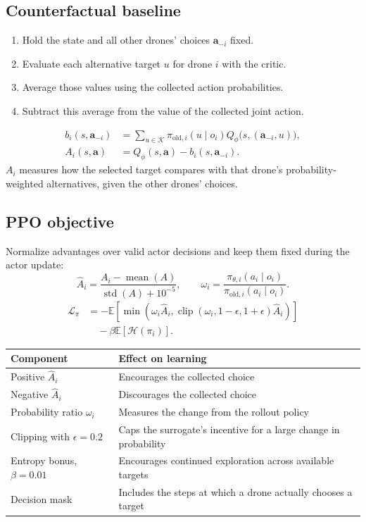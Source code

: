 \documentclass[11pt,a4paper]{article}
\newcommand{\E}{\mathbb E}
\begin{document}
\subsection{Counterfactual baseline}
\begin{enumerate}
\item Hold the state and all other drones' choices $\boldsymbol a_{-i}$ fixed.
\item Evaluate each alternative target $u$ for drone $i$ with the critic.
\item Average those values using the collected action probabilities.
\item Subtract this average from the value of the collected joint action.
\end{enumerate}
\begin{align*}
b_i(s,\boldsymbol a_{-i})
&=\sum_{u\in\mathcal K}\pi_{\mathrm{old},i}(u\mid o_i)
Q_\phi\bigl(s,(\boldsymbol a_{-i},u)\bigr),\\
A_i(s,\boldsymbol a)&=Q_\phi(s,\boldsymbol a)-b_i(s,\boldsymbol a_{-i}).
\end{align*}
$A_i$ measures how the selected target compares with
that drone's probability-weighted alternatives, given the other drones' choices.

\newpage
\subsection{PPO objective}
Normalize advantages over valid actor decisions and keep them fixed during the actor update:
\[
\widehat A_i=\frac{A_i-\operatorname{mean}(A)}{\operatorname{std}(A)+10^{-5}},
\qquad
\omega_i=\frac{\pi_{\theta,i}(a_i\mid o_i)}{\pi_{\mathrm{old},i}(a_i\mid o_i)}.
\]
\begin{align*}
\mathcal L_\pi
&=-\E\!\left[\min\!\left(\omega_i\widehat A_i,
\operatorname{clip}(\omega_i,1-\epsilon,1+\epsilon)\widehat A_i\right)\right]\\
&\quad-\beta\E[\mathcal H(\pi_i)].
\end{align*}
\begin{center}
\begin{tabularx}{\linewidth}{@{}lX@{}}
\toprule
Component & Effect on learning \\
\midrule
Positive $\widehat A_i$ & Encourages the collected choice \\
Negative $\widehat A_i$ & Discourages the collected choice \\
Probability ratio $\omega_i$ & Measures the change from the rollout policy \\
Clipping with $\epsilon=0.2$ & Caps the surrogate's incentive for a large change in probability \\
Entropy bonus, $\beta=0.01$ & Encourages continued exploration across available targets \\
Decision mask & Includes the steps at which a drone actually chooses a target \\
\bottomrule
\end{tabularx}
\end{center}
\end{document}
